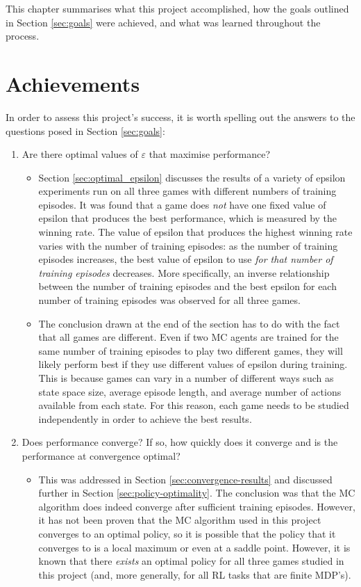 \documentclass[11pt,a4paper,twoside,openright]{report}
\begin{document}
This chapter summarises what this project accomplished, how the goals outlined in Section \ref{sec:goals} were achieved, and what was learned throughout the process.


\section{Achievements}

In order to assess this project's success, it is worth spelling out the answers to the questions posed in Section \ref{sec:goals}: 

\begin{enumerate}
	\item Are there optimal values of $\varepsilon$ that maximise performance?
	\begin{itemize}
	    \item 
Section \ref{sec:optimal_epsilon} discusses the results of a variety of epsilon experiments run on all three games with different numbers of training episodes. It was found that a game does \emph{not} have one fixed value of epsilon that produces the best performance, which is measured by the winning rate. The value of epsilon that produces the highest winning rate varies with the number of training episodes: as the number of training episodes increases, the best value of epsilon to use \emph{for that number of training episodes} decreases. More specifically, an inverse relationship between the number of training episodes and the best epsilon for each number of training episodes was observed for all three games.
        \item
The conclusion drawn at the end of the section has to do with the fact that all games are different. Even if two MC agents are trained for the same number of training episodes to play two different games, they will likely perform best if they use different values of epsilon during training. This is because games can vary in a number of different ways such as state space size, average episode length, and average number of actions available from each state. For this reason, each game needs to be studied independently in order to achieve the best results.
	\end{itemize}
	
	\item Does performance converge? If so, how quickly does it converge and is the performance at convergence optimal?
	\begin{itemize}
	    \item 
This was addressed in Section \ref{sec:convergence-results} and discussed further in Section \ref{sec:policy-optimality}. The conclusion was that the MC algorithm does indeed converge after sufficient training episodes. However, it has not been proven that the MC algorithm used in this project converges to an optimal policy, so it is possible that the policy that it converges to is a local maximum or even at a saddle point. However, it is known that there \emph{exists} an optimal policy for all three games studied in this project (and, more generally, for all RL tasks that are finite MDP's).
	\end{itemize}
	

\end{enumerate}
\end{document}
